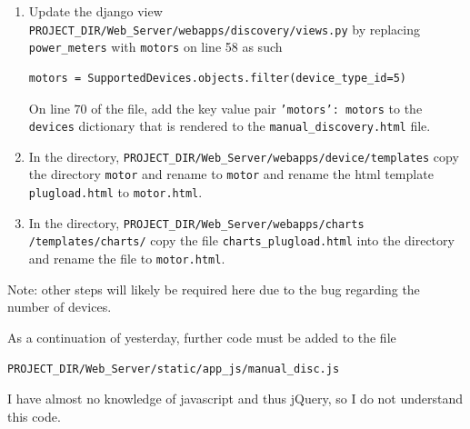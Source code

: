 \documentclass[fontsize=11pt, %
                             paper=letter, %
                             twoside, %
                             captions=tableheading,
                             index=totoc,
                             hyperref]{labbook}
\begin{document}
\begin{addmargin}[0cm]{0cm}
\begin{enumerate}
\item Update the django view\\
\texttt{PROJECT\_DIR/Web\_Server/webapps/discovery/views.py} by replacing \texttt{power\_meters} with \texttt{motors} on line 58 as such
\begin{verbatim}
motors = SupportedDevices.objects.filter(device_type_id=5)
\end{verbatim}
On line $70$ of the file, add the key value pair \texttt{'motors': motors} to the \texttt{devices} dictionary that is rendered to the \texttt{manual\_discovery.html} file.

\item In the directory, \texttt{PROJECT\_DIR/Web\_Server/webapps/device/templates} copy the directory \texttt{motor} and rename to \texttt{motor} and rename the html template \texttt{plugload.html} to \texttt{motor.html}.

\item In the directory, \texttt{PROJECT\_DIR/Web\_Server/webapps/charts\\
/templates/charts/} copy the file \texttt{charts\_plugload.html} into the directory and rename the file to \texttt{motor.html}.
\end{enumerate}

Note: other steps will likely be required here due to the bug regarding the number of devices.

As a continuation of yesterday, further code must be added to the file
\begin{verbatim}
PROJECT_DIR/Web_Server/static/app_js/manual_disc.js
\end{verbatim}
I have almost no knowledge of javascript and thus jQuery, so I do not understand this code.


\end{addmargin}
\end{document}
